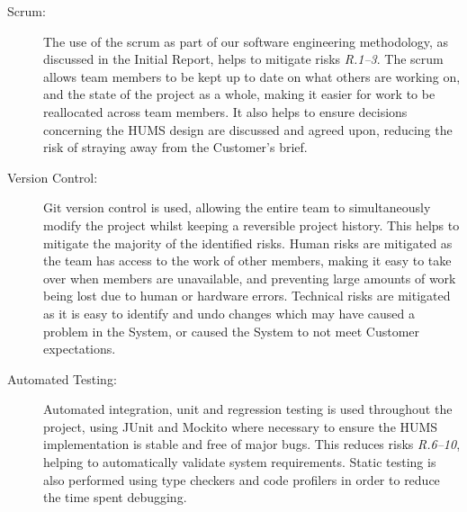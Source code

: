 \documentclass[10pt,a4paper]{article}
\begin{document}
\begin{description}
\item[Scrum:]
The use of the scrum as part of our software engineering methodology, as discussed in the Initial Report, helps to mitigate risks \emph{R.1--3}. The scrum allows team members to be kept up to date on what others are working on, and the state of the project as a whole, making it easier for work to be reallocated across team members. It also helps to ensure decisions concerning the HUMS design are discussed and agreed upon, reducing the risk of straying away from the Customer's brief.

\item[Version Control:]
Git version control is used, allowing the entire team to simultaneously modify the project whilst keeping a reversible project history. This helps to mitigate the majority of the identified risks. Human risks are mitigated as the team has access to the work of other members, making it easy to take over when members are unavailable, and preventing large amounts of work being lost due to human or hardware errors. Technical risks are mitigated as it is easy to identify and undo changes which may have caused a problem in the System, or caused the System to not meet Customer expectations.

\item[Automated Testing:] 
Automated integration, unit and regression testing is used throughout the project, using JUnit and Mockito where necessary to ensure the HUMS implementation is stable and free of major bugs. This reduces risks \emph{R.6--10}, helping to automatically validate system requirements. Static testing is also performed using type checkers and code profilers in order to reduce the time spent debugging. %
\end{description}

\end{document}

